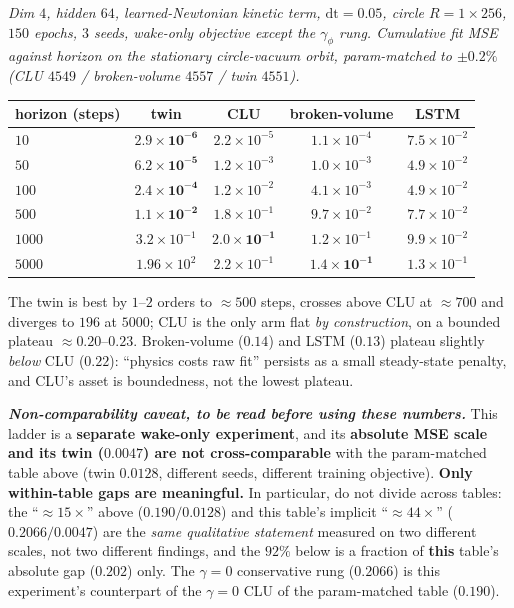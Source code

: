 \documentclass{article}
\begin{document}
\emph{Dim $4$, hidden $64$, learned-Newtonian kinetic term, $\mathrm{dt}=0.05$, circle $R{=}1{\times}256$, $150$ epochs, $3$ seeds, wake-only objective except the $\gamma_\phi$ rung. Cumulative fit MSE against horizon on the stationary circle-vacuum orbit, param-matched to $\pm0.2\%$ (CLU $4549$ / broken-volume $4557$ / twin $4551$).}

\begin{center}\footnotesize
\begin{tabular}{lcccc}
\toprule
horizon (steps) & \textbf{twin} & \textbf{CLU} & broken-volume & LSTM \\
\midrule
$10$ & $\mathbf{2.9{\times}10^{-6}}$ & $2.2{\times}10^{-5}$ & $1.1{\times}10^{-4}$ & $7.5{\times}10^{-2}$ \\
$50$ & $\mathbf{6.2{\times}10^{-5}}$ & $1.2{\times}10^{-3}$ & $1.0{\times}10^{-3}$ & $4.9{\times}10^{-2}$ \\
$100$ & $\mathbf{2.4{\times}10^{-4}}$ & $1.2{\times}10^{-2}$ & $4.1{\times}10^{-3}$ & $4.9{\times}10^{-2}$ \\
$500$ & $\mathbf{1.1{\times}10^{-2}}$ & $1.8{\times}10^{-1}$ & $9.7{\times}10^{-2}$ & $7.7{\times}10^{-2}$ \\
$1000$ & $3.2{\times}10^{-1}$ & $\mathbf{2.0{\times}10^{-1}}$ & $1.2{\times}10^{-1}$ & $9.9{\times}10^{-2}$ \\
$5000$ & $1.96{\times}10^{2}$ & $2.2{\times}10^{-1}$ & $\mathbf{1.4{\times}10^{-1}}$ & $1.3{\times}10^{-1}$ \\
\bottomrule
\end{tabular}
\end{center}

The twin is best by $1$--$2$ orders to $\approx500$ steps, crosses above CLU at $\approx700$ and diverges to $196$ at $5000$; CLU is the only arm flat \emph{by construction}, on a bounded plateau $\approx0.20$--$0.23$. Broken-volume ($0.14$) and LSTM ($0.13$) plateau slightly \emph{below} CLU ($0.22$): ``physics costs raw fit'' persists as a small steady-state penalty, and CLU's asset is boundedness, not the lowest plateau.

\emph{\textbf{Non-comparability caveat, to be read before using these numbers.}} This ladder is a \textbf{separate wake-only experiment}, and its \textbf{absolute MSE scale and its twin ($0.0047$) are not cross-comparable} with the param-matched table above (twin $0.0128$, different seeds, different training objective). \textbf{Only within-table gaps are meaningful.} In particular, do not divide across tables: the ``$\approx15\times$'' above ($0.190/0.0128$) and this table's implicit ``$\approx44\times$'' ($0.2066/0.0047$) are the \emph{same qualitative statement} measured on two different scales, not two different findings, and the $92\%$ below is a fraction of \textbf{this} table's absolute gap ($0.202$) only. The $\gamma=0$ conservative rung ($0.2066$) is this experiment's counterpart of the $\gamma=0$ CLU of the param-matched table ($0.190$).
\end{document}
